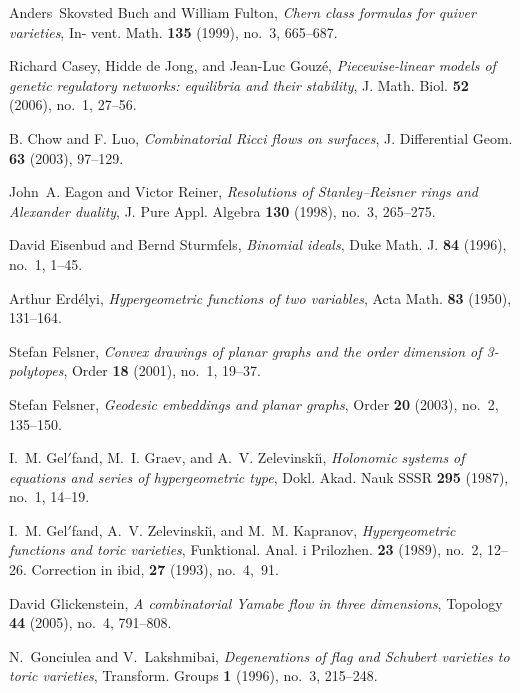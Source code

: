 \documentclass[11pt]{proposal}
\begin{document}
\begin{thebibliography}{Mat01b}
Anders~Skovsted Buch and William Fulton, \emph{Chern class formulas
  for quiver varieties}, In- vent. Math. \textbf{135} (1999), no.~3,
  665--687.

Richard Casey, Hidde de Jong, and Jean-Luc Gouz\'e,
\emph{Piecewise-linear models of genetic regulatory networks:
  equilibria and their stability}, J. Math. Biol. \textbf{52} (2006),
  no.~1, 27--56.

B. Chow and F. Luo, \emph{Combinatorial Ricci flows on surfaces},
  J. Differential Geom. \textbf{63} (2003), 97--129.

John~A. Eagon and Victor Reiner, \emph{Resolutions of
  {S}tanley--Reisner rings and {A}lexander duality}, J. Pure
  Appl. Algebra \textbf{130} (1998), no.~3, 265--275.

David Eisenbud and Bernd Sturmfels, \emph{Binomial ideals}, Duke
   Math. J. \textbf{84} (1996), no.~1, 1--45.

Arthur Erd\'elyi, \emph{Hypergeometric functions of two variables},
  Acta Math. \textbf{83} (1950), 131--164.

Stefan Felsner, \emph{Convex drawings of planar graphs and the order
  dimension of 3-polytopes}, Order \textbf{18} (2001), no.~1, 19--37.

Stefan Felsner, \emph{Geodesic embeddings and planar graphs}, Order
  \textbf{20} (2003), no.~2, 135--150.

I.~M. Gel{$'$}fand, M.~I. Graev, and A.~V. Zelevinski\u{\i},
  \emph{Holonomic systems of equations and series of hypergeometric
  type}, Dokl. Akad. Nauk SSSR \textbf{295} (1987), no.~1, 14--19.

I.~M. Gel{$'$}fand, A.~V. Zelevinski\u{\i}, and M.~M. Kapranov,
  \emph{Hypergeometric functions and toric varieties},
  Funktional. Anal. i Prilozhen. \textbf{23} (1989), no.~2, 12--26.
  Correction in ibid, \textbf{27} (1993), no.~4,~91.

David Glickenstein, \emph{A combinatorial Yamabe flow in three
  dimensions}, Topology \textbf{44} (2005), no.~4, 791--808.

N.~Gonciulea and V.~Lakshmibai, \emph{Degenerations of flag and
  {S}chubert varieties to toric varieties}, Transform. Groups \textbf{1}
  (1996), no.~3, 215--248.


\end{thebibliography}
\end{document}
